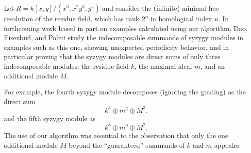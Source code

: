 \documentclass{article}
\numberwithin{equation}{section}
\theoremstyle{theorem}
\numberwithin{thm}{section}
\theoremstyle{definition}
\begin{document}
\begin{exa}
  Let $R = k[x,y]/(x^3,x^2y^3,y^5)$ and consider the (infinite) minimal free resolution of the residue field, which has rank $2^n$ in homological index $n$. In forthcoming work based in part on examples calculated using our algorithm, Dao, Eisenbud, and Polini study the indecomposable summands of syzygy modules in examples such as this one, showing unexpected periodicity behavior, and in particular proving that the syzygy modules are direct sums of only three indecomposable modules: the residue field $k$, the maximal ideal $m$, and an additional module $M$. 

  For example, the fourth syzygy module decomposes (ignoring the grading) as the direct sum
  $$ k^3 \oplus m^2 \oplus M^3. $$
  and the fifth syzygy module as 
  $$ k^8\oplus m^9 \oplus M^2. $$
  The use of our algorithm was essential to the observation that only the one additional module $M$ beyond the ``guaranteed'' summands of $k$ and $m$ appealrs.
\end{exa}



\end{document}
